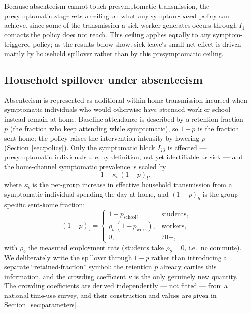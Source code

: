 \documentclass[12pt]{article}
\theoremstyle{plain}
\theoremstyle{remark}
\theoremstyle{definition}
\begin{document}
Because absenteeism cannot touch presymptomatic transmission, the presymptomatic stage sets a ceiling on what any symptom-based policy can achieve, since some of the transmission a sick worker generates occurs through $I_1$ contacts the policy does not reach. This ceiling applies equally to any symptom-triggered policy; as the results below show, sick leave's small net effect is driven mainly by household spillover rather than by this presymptomatic ceiling.

\subsection{Household spillover under absenteeism}
\label{sec:spillover}
Absenteeism is represented as additional within-home transmission incurred when symptomatic individuals who would otherwise have attended work or school instead remain at home. Baseline attendance is described by a retention fraction $p$ (the fraction who keep attending while symptomatic), so $1-p$ is the fraction sent home; the policy raises the intervention intensity by lowering $p$ (Section~\ref{sec:policy}). Only the symptomatic block $I_{23}$ is affected --- presymptomatic individuals are, by definition, not yet identifiable as sick --- and the home-channel symptomatic prevalence is scaled by
\begin{equation}
1 + \kappa_b\,(1-p)_b ,
\end{equation}
where $\kappa_b$ is the per-group increase in effective household transmission from a symptomatic individual spending the day at home, and $(1-p)_b$ is the group-specific sent-home fraction:
\begin{equation}
(1-p)_b =
\begin{cases}
1 - p_{\mathrm{school}}, & \text{students},\\
\rho_b\,(1 - p_{\mathrm{work}}), & \text{workers},\\
0, & 70+,
\end{cases}
\end{equation}
with $\rho_b$ the measured employment rate (students take $\rho_b = 0$, i.e.\ no commute). We deliberately write the spillover through $1-p$ rather than introducing a separate ``retained-fraction'' symbol: the retention $p$ already carries this information, and the crowding coefficient $\kappa$ is the only genuinely new quantity. The crowding coefficients are derived independently --- not fitted --- from a national time-use survey, and their construction and values are given in Section~\ref{sec:parameters}.
\end{document}
